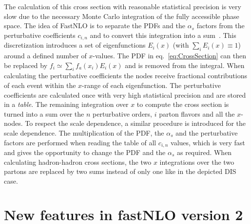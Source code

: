 \documentclass{DISproc}
\begin{document}
The calculation of this cross section with reasonable statistical precision is very slow due to the necessary Monte Carlo integration of the fully accessible phase space.
The idea of FastNLO is to separate the PDFs and the $\alpha_s$ factors from the perturbative coefficients $c_{i,n}$ and to convert this integration into a sum~\cite{Pascaud:1994vx,Wobisch:00}.
This discretization introduces a set of eigenfunctions $E_i(x)$ (with $\sum_iE_i(x) \equiv 1$) around a defined number of $x$-values. 
The PDF in eq.\ \ref{eq:CrossSection} can then be replaced by $f_i \simeq \sum_i f_a(x_i) E_i(x)$ and is removed from the integral.
When calculating the perturbative coefficients the nodes receive fractional contributions of each event within the $x$-range of each eigenfunction. The perturbative coefficients are calculated once with very high statistical precision and are stored in a \emph{table}.
The remaining integration over $x$ to compute the cross section is turned into a sum over the $n$ perturbative orders, $i$ parton flavors and all the $x$-nodes.
To respect the scale dependence, a similar procedure is introduced for the scale dependence.
The multiplication of the PDF, the $\alpha_s$ and the perturbative factors are performed when reading the table of all $c_{i,n}$ values, which is very fast and gives the opportunity to change the PDF and the $\alpha_s$ as required.
When calculating hadron-hadron cross sections, the two $x$ integrations over the two partons are replaced by two sums instead of only one like in the depicted DIS case.



\section{New features in fastNLO version 2}
\end{document}
